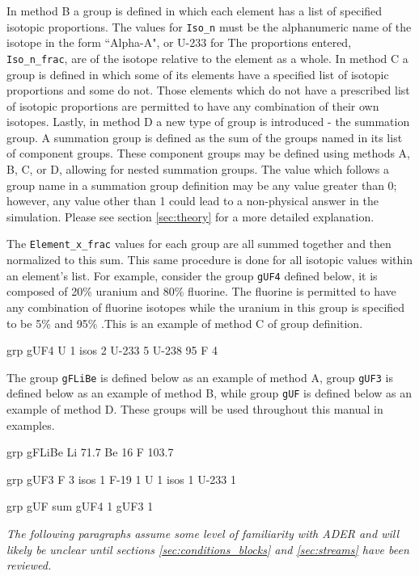 In method B a group is defined in which each element has a list of specified 
isotopic proportions. The values for \texttt{Iso\_n} must be the alphanumeric
name of the isotope in the form ``Alpha-A", or U-233 for 
The proportions entered, \texttt{Iso\_n\_frac},
are of the isotope relative to the 
element as a whole. In method C a group is defined in which some of its elements
have a specified list of isotopic proportions and some do not. Those elements
which do not have a prescribed list of isotopic proportions are permitted to
have any combination of their own isotopes. Lastly, in method D a new type
of group is introduced - the summation group. A summation group is defined as
the sum of the groups named in its list of component groups. These component
groups may be defined using methods A, B, C, or D, allowing for nested summation
groups. The value which follows a group name in a summation group definition 
may be any value greater than 0; however, any value other than 1 could
lead to a non-physical answer in the simulation. Please see section
\ref{sec:theory} for a more detailed explanation.

The \texttt{Element\_x\_frac} values for each group are all summed together
and then normalized to this sum. This same procedure is done for all
isotopic values within an element's list. For example, consider the group
\texttt{gUF4} defined below, it is composed of 20\% uranium and 80\% fluorine.
The fluorine is permitted to have any combination of fluorine isotopes while
the uranium in this group is specified to be 5\%  and 95\% .This is an example of method C of group definition.

\begin{li}
grp gUF4
U   1   isos    2
U-233   5
U-238   95
F   4
\end{li}

The group \texttt{gFLiBe} is defined below as an example of method A, group
\texttt{gUF3} is defined below as an example of method B, while group
\texttt{gUF} is defined below as an example of method D. These groups will be
used throughout this manual in examples. 

\begin{li}
grp gFLiBe
Li  71.7
Be  16
F   103.7

grp gUF3
F   3   isos    1
F-19    1
U   1   isos    1
U-233   1

grp gUF sum
gUF4    1
gUF3    1
\end{li}

\textit{The following paragraphs assume some level of familiarity with ADER and
will likely be unclear until sections \ref{sec:conditions_blocks} and 
\ref{sec:streams} have been reviewed.}

